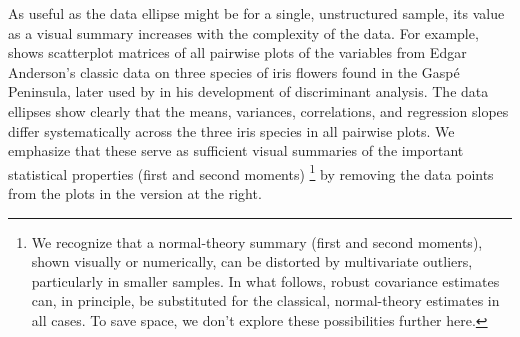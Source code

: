 As useful as the data ellipse might be for a single, unstructured
sample, its value as a visual summary increases
with the complexity of the data.
For example,  shows  scatterplot matrices
of all pairwise plots of the variables from Edgar Anderson's \citeyear{Anderson:35}
classic
data on three species of iris flowers found in the Gasp\'{e} Peninsula,
later used by \citet{Fisher:36} in his development of discriminant analysis.
The data ellipses show clearly that the means, variances, correlations,
and regression slopes differ systematically across the three iris species
in all pairwise plots.
We emphasize that these serve as sufficient visual summaries of the important
statistical properties (first and second moments)%
\footnote{
We recognize that a normal-theory summary (first and second moments),
shown visually or numerically, can be distorted
by multivariate outliers, particularly in smaller samples.
In what follows,
robust covariance estimates can, in principle, be substituted
for the classical, normal-theory estimates in all cases.
To save space, we don't explore these possibilities further here.
}
by removing the data points
from the plots in the version at the right.


